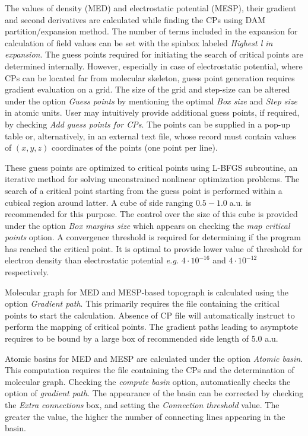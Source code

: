 \documentclass[10pt]{article}
\begin{document}
\vspace*{5mm}
The values of density (MED) and electrostatic potential (MESP), their gradient and second derivatives are calculated while 
finding the CPs using DAM partition/expansion method. 
The number of terms included in the expansion 
for calculation of field values can be set with the spinbox labeled {\it Highest l in expansion}. 
The guess points required for initiating the search of critical points are determined internally. 
However, especially in case of electrostatic potential, where CPs can be located far from molecular skeleton, 
guess point generation requires gradient evaluation on a grid. The size of the grid and step-size can be altered
under the option {\it Guess points} by mentioning the optimal {\it Box size} and {\it Step size} in atomic units.
User may intuitively provide additional guess points, if required, by checking {\it Add guess points for CPs}. The points can be 
supplied in a pop-up table or, alternatively, in an external text file, whose record must contain values of 
$(x,y,z)$ coordinates of the points (one point per line). 

These guess points are optimized to critical points using L-BFGS subroutine, an iterative method for solving
unconstrained nonlinear optimization problems. The search of a critical point starting from the guess point 
is performed within a cubical region around latter. A cube of side ranging $0.5-1.0 \;$a.u. is 
recommended for this purpose. The control over the size of this cube is provided under the option {\it Box margins size}
which appears on checking the {\it map critical points} option. A convergence threshold is required for determining if the 
program has reached the critical point. It is optimal to provide lower value of threshold for electron density than
electrostatic potential {\it e.g.} $4 \cdot 10^{-16}$ and $4 \cdot 10^{-12}$ respectively.  

Molecular graph for MED and MESP-based topograph is calculated 
using the option {\it Gradient path}. 
This primarily requires the file containing the critical points to start the calculation. 
Absence of CP file will automatically instruct to perform the mapping of critical points. 
The gradient paths leading to asymptote requires to be bound by a large box of recommended side length of 5.0 a.u. 

Atomic basins for MED and MESP are 
calculated under the option {\it Atomic basin}. This computation requires  
the file containing the CPs and the determination of molecular graph. Checking the {\it compute basin} option,
automatically checks the option of {\it gradient path}. The appearance of the basin can be corrected by checking 
the {\it Extra connections} box,
and setting the {\it Connection threshold} value. 
The greater the value, the higher the number of connecting lines appearing in the basin.
\end{document}
